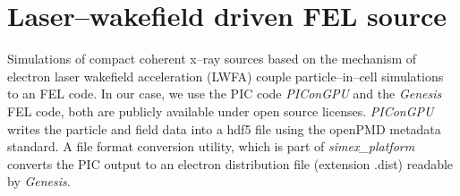 \documentclass[12pt]{scrartcl}
\begin{document}
%
\section{Laser--wakefield driven FEL source}\label{sec:lwfa_source}
%
Simulations of compact coherent x--ray sources based on the mechanism of
electron laser wakefield acceleration (LWFA) couple particle--in--cell
simulations to an FEL code. In our case, we use the PIC code \textit{PIConGPU}
and the \textit{Genesis} FEL code, both are publicly available under open source licenses.
\textit{PIConGPU} writes the particle and field data
into a hdf5 file using the openPMD \cite{Huebl2017} metadata standard. A file format conversion utility, which is part of
\textit{simex\_platform} converts the PIC output to an electron distribution
file (extension .dist) readable by \textit{Genesis}.




\FloatBarrier

\printbibliography[notkeyword=submitted, notkeyword=inpreparation, notkeyword=report, notkeyword=zenodo, title={Journal articles}]
%
\printbibliography[keyword=submitted, title={Submitted articles}]
%
\printbibliography[keyword=inpreparation, title={Articles in preparation}]
%
\printbibliography[keyword=eucall, keyword=report, title={EUCALL reports}]
%
\printbibliography[keyword=zenodo, title={Zenodo depositions}]
\end{document}
